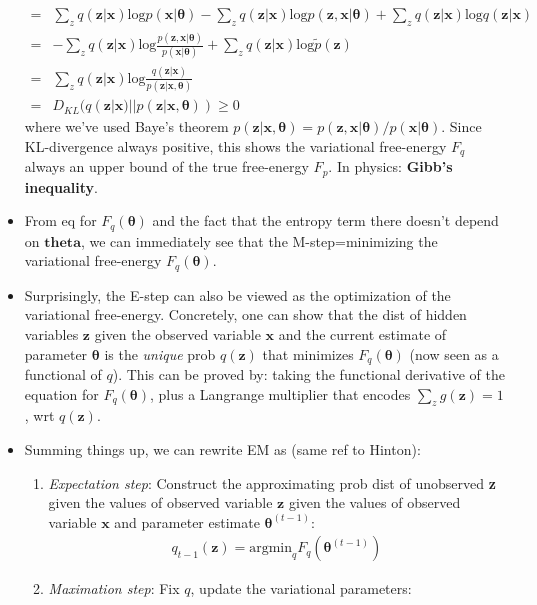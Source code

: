 \documentclass[norsk,a4paper,11pt]{article}
\begin{document}
\begin{itemize}
\begin{align}
		=& \sum_z q(\bm{z}|\bm{x}) \text{log}p(\bm{x}|\bm{\theta}) - \sum_z  q(\bm{z}|\bm{x}) \text{log} p(\bm{z}, \bm{x}| \bm{\theta}) + \sum_z q(\bm{z}|\bm{x}) \text{log}q(\bm{z}|\bm{x}) \\
		=& - \sum_z q(\bm{z}|\bm{x}) \text{log} \frac{p(\bm{z}, \bm{x}| \bm{\theta})}{p(\bm{x}| \bm{\theta})} + \sum_z q(\bm{z}|\bm{x}) \text{log} \tilde{p}(\bm{z}) \\
		=& \sum_z q(\bm{z}|\bm{x}) \text{log} \frac{q(\bm{z}|\bm{x})}{p(\bm{z}|\bm{x}, \bm{\theta})} \\
		=& D_{KL} (q(\bm{z}|\bm{x}) || p(\bm{z}|\bm{x}, \bm{\theta})) \geq 0
	\end{align}
	where we've used Baye's theorem $p(\bm{z}|\bm{x}, \bm{\theta})= p(\bm{z},\bm{x} | \bm{\theta}) / p(\bm{x} | \bm{\theta})$. Since KL-divergence always positive, this shows the variational free-energy $F_q$ always an upper bound of the true free-energy $F_p$. In physics: \textbf{Gibb's inequality}.
	\item From eq for $F_q(\bm{\theta})$ and the fact that the entropy term there doesn't depend on $\bm{theta}$, we can immediately see that the M-step=minimizing the variational free-energy $F_q(\bm{\theta})$.
	\item Surprisingly, the E-step can also be viewed as the optimization of the variational free-energy. Concretely, one can show that the dist of hidden variables $\bm{z}$ given the observed variable $\bm{x}$ and the current estimate of parameter $\bm{\theta}$ is the \textit{unique} prob $q(\bm{z})$ that minimizes $F_q(\bm{\theta})$ (now seen as a functional of $q$). This can be proved by: taking the functional derivative of the equation for $F_q(\bm{\theta})$, plus a Langrange multiplier that encodes $\sum_z g(\bm{z}) = 1$, wrt $q(\bm{z})$.
	\item Summing things up, we can rewrite EM as (same ref to Hinton):
	\begin{enumerate}
		\item \textit{Expectation step}: Construct the approximating prob dist of unobserved \textbf{z} given the values of observed variable $\bm{z}$ given the values of observed variable $\bm{x}$ and parameter estimate $\bm{\theta}^{(t-1)}$:
		\begin{align}
			q_{t-1} (\bm{z}) = \text{argmin}_q F_q (\bm{\theta}^{(t-1)})
		\end{align} 
		\item \textit{Maximation step}: Fix $q$, update the variational parameters:
		\begin{align}

\end{align}
\end{enumerate}
\end{itemize}
\end{document}
